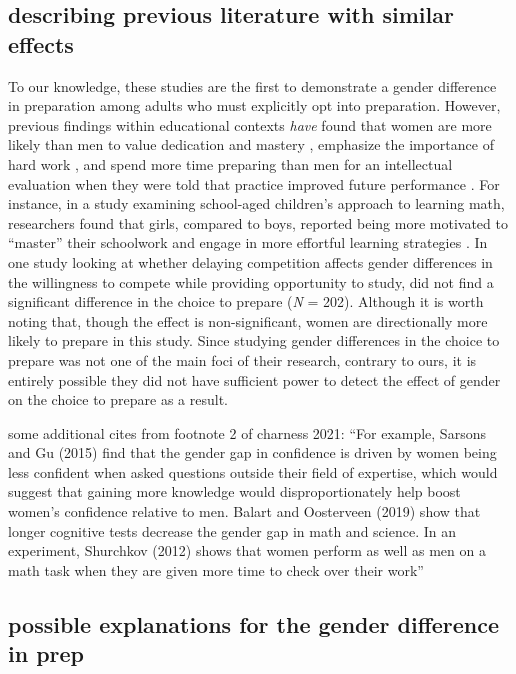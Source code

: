 \documentclass[a4paper, nobind]{templates/ociamthesis}
\begin{document}
\hypertarget{describing-previous-literature-with-similar-effects}{%
\subsection{describing previous literature with similar effects}\label{describing-previous-literature-with-similar-effects}}

To our knowledge, these studies are the first to demonstrate a gender difference in preparation among adults who must explicitly opt into preparation. However, previous findings within educational contexts \emph{have} found that women are more likely than men to value dedication and mastery \autocite{Leslie2015,Kenney-Benson2006}, emphasize the importance of hard work \autocite{Mccrea2008,Hirt2009,Mccrea2008a}, and spend more time preparing than men for an intellectual evaluation when they were told that practice improved future performance \autocite{Kimble2005}. For instance, in a study examining school-aged children's approach to learning math, researchers found that girls, compared to boys, reported being more motivated to ``master'' their schoolwork and engage in more effortful learning strategies \autocite{Kenney-Benson2006}. In one study looking at whether delaying competition affects gender differences in the willingness to compete while providing opportunity to study, \textcite{Charness2021} did not find a significant difference in the choice to prepare (\emph{N} = 202). Although it is worth noting that, though the effect is non-significant, women are directionally more likely to prepare in this study. Since studying gender differences in the choice to prepare was not one of the main foci of their research, contrary to ours, it is entirely possible they did not have sufficient power to detect the effect of gender on the choice to prepare as a result.

some additional cites from footnote 2 of charness 2021: ``For example, Sarsons and Gu (2015) find that the gender gap in confidence is driven by women being less confident when asked questions outside their field of expertise, which would suggest that gaining more knowledge would disproportionately help boost women's confidence relative to men. Balart and Oosterveen (2019) show that longer cognitive tests decrease the gender gap in math and science. In an experiment, Shurchkov (2012) shows that women perform as well as men on a math task when they are given more time to check over their work''

\hypertarget{possible-explanations-for-the-gender-difference-in-prep}{%
\subsection{possible explanations for the gender difference in prep}\label{possible-explanations-for-the-gender-difference-in-prep}}
\end{document}
